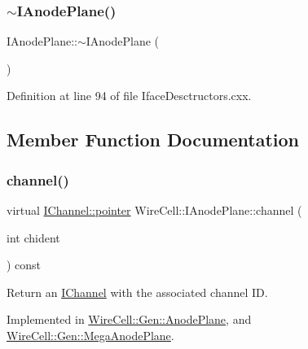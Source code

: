 \subsubsection{\texorpdfstring{$\sim$\+I\+Anode\+Plane()}{~IAnodePlane()}}
{\footnotesize\ttfamily I\+Anode\+Plane\+::$\sim$\+I\+Anode\+Plane (\begin{DoxyParamCaption}{ }\end{DoxyParamCaption})\hspace{0.3cm}{\ttfamily [virtual]}}



Definition at line 94 of file Iface\+Desctructors.\+cxx.



\subsection{Member Function Documentation}
\mbox{\label{class_wire_cell_1_1_i_anode_plane_ab9cab29e958c7cc4aa7dd9cb600c33cd}} 
\subsubsection{\texorpdfstring{channel()}{channel()}}
{\footnotesize\ttfamily virtual \hyperlink{class_wire_cell_1_1_i_data_aff870b3ae8333cf9265941eef62498bc}{I\+Channel\+::pointer} Wire\+Cell\+::\+I\+Anode\+Plane\+::channel (\begin{DoxyParamCaption}\item[{int}]{chident }\end{DoxyParamCaption}) const\hspace{0.3cm}{\ttfamily [pure virtual]}}



Return an \hyperlink{class_wire_cell_1_1_i_channel}{I\+Channel} with the associated channel ID. 



Implemented in \hyperlink{class_wire_cell_1_1_gen_1_1_anode_plane_ae5d1df06d19a616c9d0c46a0b74f7c81}{Wire\+Cell\+::\+Gen\+::\+Anode\+Plane}, and \hyperlink{class_wire_cell_1_1_gen_1_1_mega_anode_plane_a3cc2a292c89472524f21379c0eff1111}{Wire\+Cell\+::\+Gen\+::\+Mega\+Anode\+Plane}.

\mbox{\label{class_wire_cell_1_1_i_anode_plane_a8de1ff56146e343b9ad266eaa011065a}} 
